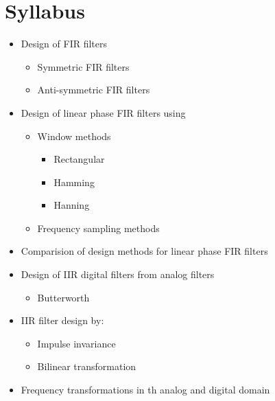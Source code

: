 \documentclass[../course]{subfiles}
\begin{document}
\section{Syllabus}

\begin{itemize}

    \item Design of FIR filters

        \begin{itemize}
            \item Symmetric FIR filters
            \item Anti-symmetric FIR filters
        \end{itemize}

    \item Design of linear phase FIR filters using

        \begin{itemize}

            \item Window methods

                \begin{itemize}

                    \item Rectangular
                    \item Hamming
                    \item Hanning

                \end{itemize}

            \item Frequency sampling methods

        \end{itemize}

    \item Comparision of design methods for linear phase FIR filters
    \item Design of IIR digital filters from analog filters

        \begin{itemize}

            \item Butterworth

        \end{itemize}

    \item IIR filter design by:

        \begin{itemize}

            \item Impulse invariance
            \item Bilinear transformation

        \end{itemize}

    \item Frequency transformations in th analog and digital domain

\end{itemize}
\end{document}
